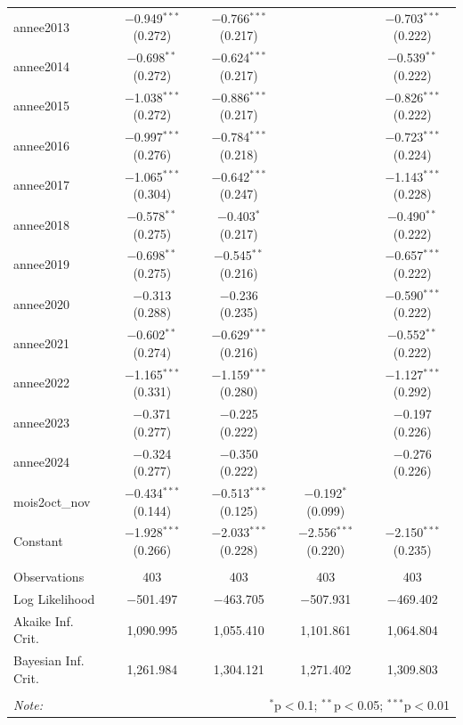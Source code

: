 \begin{table}[!htbp]
\begin{tabular}{@{\extracolsep{5pt}}lcccc}
  annee2013 & $-$0.949$^{***}$ (0.272) & $-$0.766$^{***}$ (0.217) &  & $-$0.703$^{***}$ (0.222) \\ 
  annee2014 & $-$0.698$^{**}$ (0.272) & $-$0.624$^{***}$ (0.217) &  & $-$0.539$^{**}$ (0.222) \\ 
  annee2015 & $-$1.038$^{***}$ (0.272) & $-$0.886$^{***}$ (0.217) &  & $-$0.826$^{***}$ (0.222) \\ 
  annee2016 & $-$0.997$^{***}$ (0.276) & $-$0.784$^{***}$ (0.218) &  & $-$0.723$^{***}$ (0.224) \\ 
  annee2017 & $-$1.065$^{***}$ (0.304) & $-$0.642$^{***}$ (0.247) &  & $-$1.143$^{***}$ (0.228) \\ 
  annee2018 & $-$0.578$^{**}$ (0.275) & $-$0.403$^{*}$ (0.217) &  & $-$0.490$^{**}$ (0.222) \\ 
  annee2019 & $-$0.698$^{**}$ (0.275) & $-$0.545$^{**}$ (0.216) &  & $-$0.657$^{***}$ (0.222) \\ 
  annee2020 & $-$0.313 (0.288) & $-$0.236 (0.235) &  & $-$0.590$^{***}$ (0.222) \\ 
  annee2021 & $-$0.602$^{**}$ (0.274) & $-$0.629$^{***}$ (0.216) &  & $-$0.552$^{**}$ (0.222) \\ 
  annee2022 & $-$1.165$^{***}$ (0.331) & $-$1.159$^{***}$ (0.280) &  & $-$1.127$^{***}$ (0.292) \\ 
  annee2023 & $-$0.371 (0.277) & $-$0.225 (0.222) &  & $-$0.197 (0.226) \\ 
  annee2024 & $-$0.324 (0.277) & $-$0.350 (0.222) &  & $-$0.276 (0.226) \\ 
  mois2oct\_nov & $-$0.434$^{***}$ (0.144) & $-$0.513$^{***}$ (0.125) & $-$0.192$^{*}$ (0.099) &  \\ 
  Constant & $-$1.928$^{***}$ (0.266) & $-$2.033$^{***}$ (0.228) & $-$2.556$^{***}$ (0.220) & $-$2.150$^{***}$ (0.235) \\ 
 \hline \\[-1.8ex] 
Observations & 403 & 403 & 403 & 403 \\ 
Log Likelihood & $-$501.497 & $-$463.705 & $-$507.931 & $-$469.402 \\ 
Akaike Inf. Crit. & 1,090.995 & 1,055.410 & 1,101.861 & 1,064.804 \\ 
Bayesian Inf. Crit. & 1,261.984 & 1,304.121 & 1,271.402 & 1,309.803 \\ 
\hline 
\hline \\[-1.8ex] 
\textit{Note:}  & \multicolumn{4}{r}{$^{*}$p$<$0.1; $^{**}$p$<$0.05; $^{***}$p$<$0.01} \\ 
\end{tabular} 
\end{table} 
